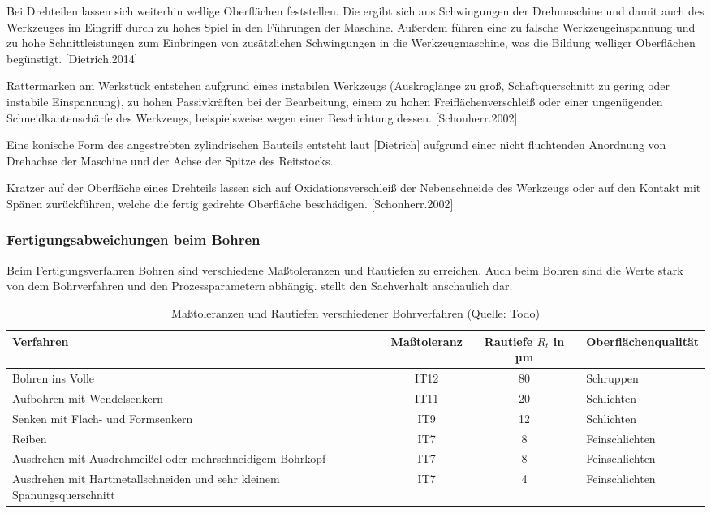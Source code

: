Bei Drehteilen lassen sich weiterhin wellige Oberflächen feststellen. Die ergibt sich aus Schwingungen der Drehmaschine und damit auch des Werkzeuges im Eingriff durch zu hohes Spiel in den Führungen der Maschine. Außerdem führen eine zu falsche Werkzeugeinspannung und zu hohe Schnittleistungen zum Einbringen von zusätzlichen Schwingungen in die Werkzeugmaschine, was die Bildung welliger Oberflächen begünstigt. [Dietrich.2014] 

Rattermarken am Werkstück entstehen aufgrund eines instabilen Werkzeugs (Auskraglänge zu groß, Schaftquerschnitt zu gering oder instabile Einspannung), zu hohen Passivkräften bei der Bearbeitung, einem zu hohen Freiflächenverschleiß oder einer ungenügenden Schneidkantenschärfe des Werkzeugs, beispielsweise wegen einer Beschichtung dessen. [Schonherr.2002]

Eine konische Form des angestrebten zylindrischen Bauteils entsteht laut [Dietrich] aufgrund einer nicht fluchtenden Anordnung von Drehachse der Maschine und der Achse der Spitze des Reitstocks. 

Kratzer auf der Oberfläche eines Drehteils lassen sich auf Oxidationsverschleiß der Nebenschneide des Werkzeugs oder auf den Kontakt mit Spänen zurückführen, welche die fertig gedrehte Oberfläche beschädigen. [Schonherr.2002] 

\subsubsection {Fertigungsabweichungen beim Bohren}

Beim Fertigungsverfahren Bohren sind verschiedene Maßtoleranzen und Rautiefen zu erreichen. Auch beim Bohren sind die Werte stark von dem Bohrverfahren und den Prozessparametern abhängig.
 stellt den Sachverhalt anschaulich dar.

\begin{table}[h]	
	
	\begin{tabularx}{\columnwidth}{|X|c|c|l|}	
		
		
		\hline
		\textbf{Verfahren}&\textbf{Maßtoleranz}&\textbf{Rautiefe $R_{t}$ in µm}&\textbf{Oberflächenqualität}\\
		\hline
		Bohren ins Volle&IT12&80&Schruppen\\
		\hline
		Aufbohren mit Wendelsenkern&IT11&20&Schlichten\\
		\hline
		Senken mit Flach- und Form\-senkern&IT9&12&Schlichten\\
		\hline
		Reiben&IT7&8&Feinschlichten\\
		\hline
		Ausdrehen mit Ausdrehmeißel oder mehrschneidigem Bohrkopf&IT7&8&Feinschlichten\\
		\hline
		Ausdrehen mit Hartmetallschneiden und sehr kleinem Spanungsquerschnitt&IT7&4&Feinschlichten\\
		\hline	
		
	\end{tabularx}
	
	\caption{Maßtoleranzen und Rautiefen verschiedener Bohrverfahren (Quelle: Todo)}
	\label{tab:bohrungsqualitaet}

\end{table}

